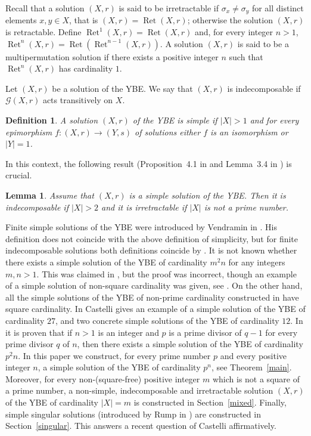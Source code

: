 \documentclass[10pt]{article}
\newtheorem{lemma}[theorem]{Lemma}
\newtheorem{definition}[theorem]{Definition}
\newcommand{\Ret}{\operatorname{Ret}}
\begin{document}
Recall that a solution $(X,r)$ is  said to be irretractable if
$\sigma_x\neq \sigma_y$ for all distinct elements $x,y\in X$, that
is $(X,r)=\Ret(X,r)$; otherwise the solution $(X,r)$ is
retractable.  Define $\Ret^1(X,r)=\Ret(X,r)$ and, for every
integer $n>1$, $\Ret^{n}(X,r)=\Ret(\Ret^{n-1}(X,r))$. A solution
$(X,r)$ is said to be a multipermutation solution if there exists
a positive integer $n$ such that $\Ret^n(X,r)$ has cardinality
$1$.




Let $(X,r)$ be a solution of the YBE. We say that $(X,r)$ is
indecomposable if $\mathcal{G}(X,r)$ acts transitively on $X$.


\begin{definition}
    A solution $(X,r)$ of the YBE is simple if $|X|>1$ and for every
    epimorphism $f:(X,r) \longrightarrow (Y,s)$ of solutions either $f$
    is an isomorphism or $|Y|=1$.
\end{definition}


In this context, the following result (Proposition~4.1 in
\cite{CO21} and Lemma~3.4 in \cite{CO22}) is crucial.

\begin{lemma}  \label{simple indec}
Assume that $(X,r)$ is a simple solution of the YBE. Then it is
indecomposable if $|X|>2$ and it is irretractable if $|X|$ is not
a prime number.
\end{lemma}

Finite simple solutions of the YBE were introduced by Vendramin in \cite{V}. His definition does not coincide with the above definition of simplicity, but for finite indecomposable solutions both definitions coincide by \cite[Proposition 2]{CCP}.
It is not known whether there exists a simple solution of the YBE of cardinality $m^2n$ for any integers $m,n>1$. This was claimed in \cite[Theorem 4.12]{CO21}, but the proof was  incorrect, though an example of a simple solution of non-square cardinality was given, see \cite{Corrigendum}. On the other hand, all the simple solutions of the YBE of non-prime cardinality constructed in \cite{CO21,CO22} have square cardinality.
In \cite{Cast} Castelli gives an example of a simple solution of the YBE of cardinality $27$, and two concrete simple solutions of the YBE of cardinality $12$. In \cite[Theorem 5.3]{CO24} it is proven that if
$n>1$ is an integer and $p$ is a prime divisor of $q-1$ for every
prime divisor $q$ of $n$, then there exists a simple solution of
the YBE of cardinality $p^2n$.
In this paper we construct, for every prime number $p$ and every positive integer $n$, a simple solution of the YBE of cardinality $p^n$, see Theorem~\ref{main}.
Moreover, for every non-(square-free) positive integer $m$ which
is not a square of a prime number, a non-simple, indecomposable and
irretractable solution
$(X,r)$ of the YBE of cardinality $|X|=m$ is
constructed in Section~\ref{mixed}. Finally, simple singular solutions (introduced by Rump in \cite{Rump23}) are constructed in Section~\ref{singular}. This answers a recent question of Castelli \cite{Castelli} affirmatively.
\end{document}
